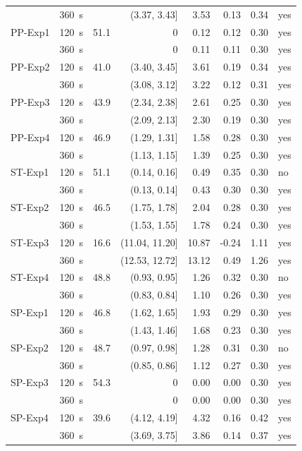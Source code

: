{\begin{longtable}{llrrrrrl}
 & 360~s &  & (3.37, 3.43] & 3.53 & 0.13 & 0.34 & yes \\
PP-Exp1 & 120~s & 51.1 & 0 & 0.12 & 0.12 & 0.30 & yes \\
 & 360~s &  & 0 & 0.11 & 0.11 & 0.30 & yes \\
PP-Exp2 & 120~s & 41.0 & (3.40, 3.45] & 3.61 & 0.19 & 0.34 & yes \\
 & 360~s &  & (3.08, 3.12] & 3.22 & 0.12 & 0.31 & yes \\
PP-Exp3 & 120~s & 43.9 & (2.34, 2.38] & 2.61 & 0.25 & 0.30 & yes \\
 & 360~s &  & (2.09, 2.13] & 2.30 & 0.19 & 0.30 & yes \\
PP-Exp4 & 120~s & 46.9 & (1.29, 1.31] & 1.58 & 0.28 & 0.30 & yes \\
 & 360~s &  & (1.13, 1.15] & 1.39 & 0.25 & 0.30 & yes \\
ST-Exp1 & 120~s & 51.1 & (0.14, 0.16] & 0.49 & 0.35 & 0.30 & no \\
 & 360~s &  & (0.13, 0.14] & 0.43 & 0.30 & 0.30 & yes \\
ST-Exp2 & 120~s & 46.5 & (1.75, 1.78] & 2.04 & 0.28 & 0.30 & yes \\
 & 360~s &  & (1.53, 1.55] & 1.78 & 0.24 & 0.30 & yes \\
ST-Exp3 & 120~s & 16.6 & (11.04, 11.20] & 10.87 & -0.24 & 1.11 & yes \\
 & 360~s &  & (12.53, 12.72] & 13.12 & 0.49 & 1.26 & yes \\
ST-Exp4 & 120~s & 48.8 & (0.93, 0.95] & 1.26 & 0.32 & 0.30 & no \\
 & 360~s &  & (0.83, 0.84] & 1.10 & 0.26 & 0.30 & yes \\
SP-Exp1 & 120~s & 46.8 & (1.62, 1.65] & 1.93 & 0.29 & 0.30 & yes \\
 & 360~s &  & (1.43, 1.46] & 1.68 & 0.23 & 0.30 & yes \\
SP-Exp2 & 120~s & 48.7 & (0.97, 0.98] & 1.28 & 0.31 & 0.30 & no \\
 & 360~s &  & (0.85, 0.86] & 1.12 & 0.27 & 0.30 & yes \\
SP-Exp3 & 120~s & 54.3 & 0 & 0.00 & 0.00 & 0.30 & yes \\
 & 360~s &  & 0 & 0.00 & 0.00 & 0.30 & yes \\
SP-Exp4 & 120~s & 39.6 & (4.12, 4.19] & 4.32 & 0.16 & 0.42 & yes \\
 & 360~s &  & (3.69, 3.75] & 3.86 & 0.14 & 0.37 & yes \\
\bottomrule
\end{longtable}
}
